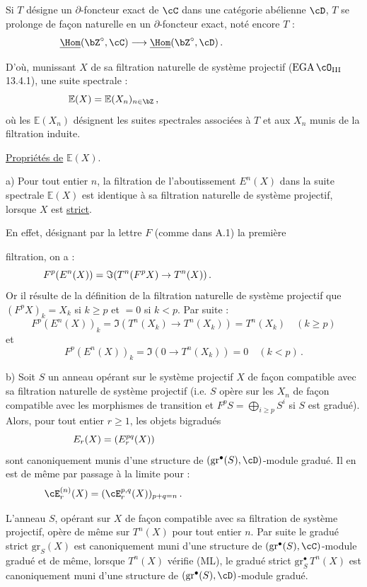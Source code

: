 Si $T$ d\'esigne un $\partial$-foncteur exact de $\cC$ dans une cat\'egorie ab\'elienne $\cD$, $T$ se prolonge de fa\c con naturelle en un $\partial$-foncteur exact, not\'e encore $T$ :
\[
\underline{\Hom}(\bZ^{\circ}, \cC) \longrightarrow \underline{\Hom}(\bZ^{\circ}, \cD)\,.\hspace*{3cm}
\]

D'o\`u, munissant $X$ de sa filtration naturelle de syst\`eme projectif ($\mathrm{EGA}\,\cO_{\mathrm{III}}$ 13.4.1), une suite spectrale :
\[
\mathbb{E}(X) = \mathbb{E}(X_n)_{n \in \bZ}\,,\hspace*{5cm}
\]
o\`u les $\mathbb{E}(X_n)$ d\'esignent les suites spectrales associ\'ees \`a $T$ et aux $X_n$ munis de la filtration induite.

\smallskip

\noindent
\underline{Propri\'et\'es de} $\mathbb{E}(X)$.

a) Pour tout entier $n$, la filtration de l'aboutissement $E^n(X)$ dans la suite spectrale $\mathbb{E}(X)$ est identique \`a sa filtration naturelle de syst\`eme projectif, lorsque $X$ est \underline{strict}.

En effet, d\'esignant par la lettre $F$ (comme dans A.1) la premi\`ere

\newpage

filtration, on a :
\[
F^p(E^n(X)) = \Im(T^n(F^p X) \rightarrow T^n(X))\,.\hspace*{4cm}
\]
Or il r\'esulte de la d\'efinition de la filtration naturelle de syst\`eme projectif que $(F^p X)_k = X_k$ si $k \geq p$ et $= 0$ si $k < p$. Par suite :
\[
F^p(E^n(X))_k = \Im(T^n(X_k) \rightarrow T^n(X_k)) = T^n(X_k) \quad (k \geq p)
\]
et
\[
F^p(E^n(X))_k = \Im(0 \rightarrow T^n(X_k)) = 0 \quad (k < p)\,.
\]

b) Soit $S$ un anneau op\'erant sur le syst\`eme projectif $X$ de fa\c con compatible avec sa filtration naturelle de syst\`eme projectif (i.e. $S$ op\`ere sur les $X_n$ de fa\c con compatible avec les morphismes de transition et $F^p S = \bigoplus_{i \geq p} S^i$ si $S$ est gradu\'e). Alors, pour tout entier $r \geq 1$, les objets bigradu\'es
\[
E_r(X) = (E_r^{pq}(X))\hspace*{5cm}
\]
sont canoniquement munis d'une structure de $(\mathrm{gr}^{\bullet}(S), \cD)$-module gradu\'e. Il en est de m\^eme par passage \`a la limite pour :
\[
\cE_r^{(n)}(X) = (\cE_r^{p,q}(X))_{p+q=n}\,.\hspace*{5cm}
\]

L'anneau $S$, op\'erant sur $X$ de fa\c con compatible avec sa filtration de syst\`eme projectif, op\`ere de m\^eme sur $T^n(X)$ pour tout entier $n$. Par suite le gradu\'e strict $\mathrm{gr}_S(X)$ est canoniquement muni d'une structure de $(\mathrm{gr}^{\bullet}(S), \cC)$-module gradu\'e et de m\^eme, lorsque $T^n(X)$ v\'erifie (ML), le gradu\'e strict $\mathrm{gr}_S^{\bullet}\,T^n(X)$ est canoniquement muni d'une structure de $(\mathrm{gr}^{\bullet}(S), \cD)$-module gradu\'e.

